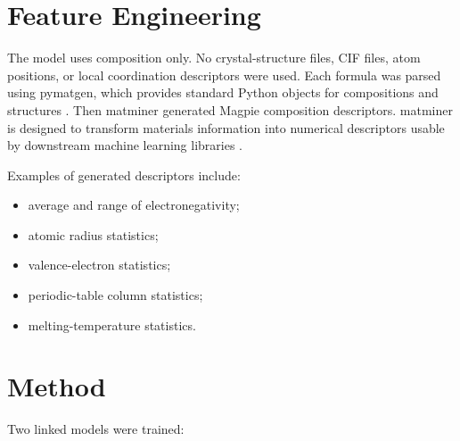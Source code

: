 \documentclass[11pt,a4paper]{article}
\begin{document}
\section{Feature Engineering}

The model uses composition only. No crystal-structure files, CIF files, atom positions, or local coordination descriptors were used. Each formula was parsed using pymatgen, which provides standard Python objects for compositions and structures \cite{pymatgen}. Then matminer generated Magpie composition descriptors. matminer is designed to transform materials information into numerical descriptors usable by downstream machine learning libraries \cite{matminer}.

Examples of generated descriptors include:

\begin{itemize}
  \item average and range of electronegativity;
  \item atomic radius statistics;
  \item valence-electron statistics;
  \item periodic-table column statistics;
  \item melting-temperature statistics.
\end{itemize}

\begin{center}
\end{center}

\section{Method}

Two linked models were trained:
\end{document}
